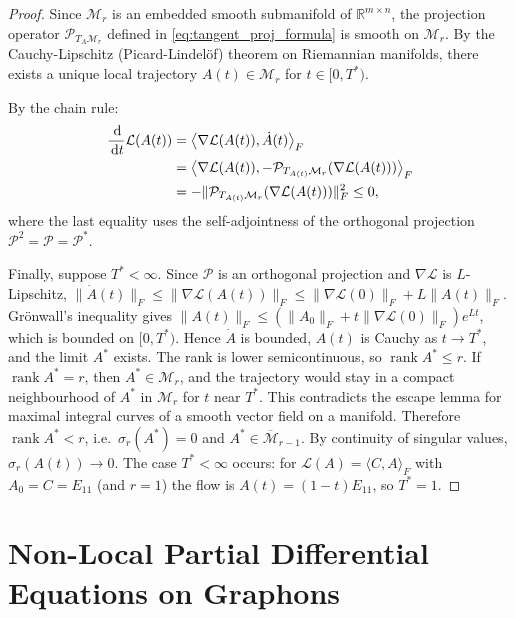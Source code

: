\documentclass[11pt,a4paper,reqno]{amsart}
\theoremstyle{definition}
\numberwithin{equation}{section}
\providecommand{\R}{\mathbb{R}}
\newcommand{\rank}{\operatorname{rank}}
\newcommand{\inner}[2]{\left\langle #1, #2 \right\rangle}
\newcommand{\dif}{\,\mathrm{d}}
\providecommand{\R}{\mathbb{R}}
\begin{document}
\begin{proof}
Since $\mathcal{M}_r$ is an embedded smooth submanifold of $\R^{m \times n}$, the projection operator $\mathcal{P}_{T_A \mathcal{M}_r}$ defined in \eqref{eq:tangent_proj_formula} is smooth on $\mathcal{M}_r$. By the Cauchy-Lipschitz (Picard-Lindel\"of) theorem on Riemannian manifolds, there exists a unique local trajectory $A(t) \in \mathcal{M}_r$ for $t \in [0, T^*)$.

By the chain rule:
\begin{align}
    \frac{\dif}{\dif t} \mathcal{L}(A(t)) &= \inner{\nabla \mathcal{L}(A(t))}{\dot{A}(t)}_F \notag \\
    &= \inner{\nabla \mathcal{L}(A(t))}{-\mathcal{P}_{T_{A(t)} \mathcal{M}_r}(\nabla \mathcal{L}(A(t)))}_F \notag \\
    &= -\|\mathcal{P}_{T_{A(t)} \mathcal{M}_r}(\nabla \mathcal{L}(A(t)))\|_F^2 \le 0,
\end{align}
where the last equality uses the self-adjointness of the orthogonal projection $\mathcal{P}^2 = \mathcal{P} = \mathcal{P}^*$.

Finally, suppose $T^* < \infty$. Since $\mathcal{P}$ is an orthogonal projection and $\nabla\mathcal{L}$ is $L$-Lipschitz, $\|\dot A(t)\|_F \le \|\nabla \mathcal{L}(A(t))\|_F \le \|\nabla\mathcal{L}(0)\|_F + L\|A(t)\|_F$. Gr\"onwall's inequality gives $\|A(t)\|_F \le (\|A_0\|_F + t\|\nabla\mathcal{L}(0)\|_F)e^{Lt}$, which is bounded on $[0,T^*)$. Hence $\dot A$ is bounded, $A(t)$ is Cauchy as $t \to T^*$, and the limit $A^*$ exists. The rank is lower semicontinuous, so $\rank A^* \le r$. If $\rank A^* = r$, then $A^* \in \mathcal{M}_r$, and the trajectory would stay in a compact neighbourhood of $A^*$ in $\mathcal{M}_r$ for $t$ near $T^*$. This contradicts the escape lemma for maximal integral curves of a smooth vector field on a manifold. Therefore $\rank A^* < r$, i.e.\ $\sigma_r(A^*) = 0$ and $A^* \in \overline{\mathcal{M}}_{r-1}$. By continuity of singular values, $\sigma_r(A(t)) \to 0$. The case $T^* < \infty$ occurs: for $\mathcal{L}(A) = \langle C, A\rangle_F$ with $A_0 = C = E_{11}$ (and $r = 1$) the flow is $A(t) = (1-t)E_{11}$, so $T^* = 1$.
\end{proof}

\section{Non-Local Partial Differential Equations on Graphons}
\label{sec:graphon_pdes}
\end{document}
